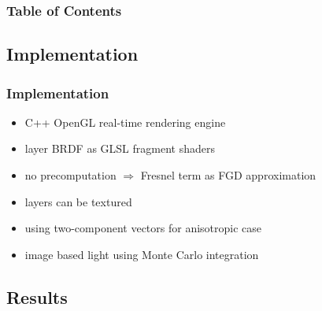 \begin{frame}
    \frametitle{Table of Contents}
    \setcounter{tocdepth}{2}
    \tableofcontents[currentsection,subsectionstyle=show/show/hide]
\end{frame}

\subsection{Implementation}

\begin{frame}
    \frametitle{Implementation}
    \begin{itemize}
        \setlength\itemsep{1em}
        \item<1-> C++ OpenGL real-time rendering engine
        \item<1-> layer BRDF as GLSL fragment shaders
        \item<2-> no precomputation $\Rightarrow$ Fresnel term as FGD approximation
        \item<3-> layers can be textured
        \item<4-> using two-component vectors for anisotropic case
        \item<4-> image based light using Monte Carlo integration
    \end{itemize}
\end{frame}

\subsection{Results}

